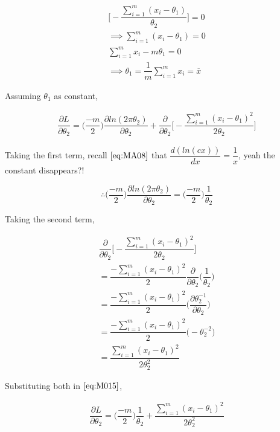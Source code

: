 \documentclass[float=false,crop=false]{standalone}
\begin{document}
\begin{equation}\begin{aligned} 
\Bigg[-\dfrac{  \sum_{i=1}^m(x_i-\theta_1) }{\theta_2}\Bigg] = 0 \\
\implies \sum_{i=1}^m(x_i-\theta_1) = 0 \\
\sum_{i=1}^mx_i-m\theta_1 = 0 \\
\implies \theta_1 = \dfrac{1}{m}\sum_{i=1}^mx_i = \overline{x} \label{eq:M014}
\end{aligned}\end{equation}

    Assuming \(\theta_1\) as constant,

\begin{equation}\begin{aligned}
\dfrac{\partial L}{\partial \theta_2} = \bigg( \dfrac{-m}{2} \bigg) \dfrac{\partial ln(2\pi \theta_2)}{\partial \theta_2} + \dfrac{\partial }{\partial \theta_2}\Bigg[-\dfrac{  \sum_{i=1}^m(x_i-\theta_1)^2 }{2\theta_2}\Bigg] \label{eq:M015}
\end{aligned}\end{equation}

    Taking the first term, recall \(\ref{eq:MA08}\) that
\(\dfrac{d(ln(cx))}{dx} = \dfrac{1}{x}\), yeah the constant disappears?!

\[
\therefore \bigg( \dfrac{-m}{2} \bigg) \dfrac{\partial ln(2\pi \theta_2)}{\partial \theta_2}
= \bigg( \dfrac{-m}{2} \bigg) \dfrac{1}{\theta_2}
\]

    Taking the second term,

\[\begin{aligned}
\dfrac{\partial }{\partial \theta_2}\Bigg[-\dfrac{  \sum_{i=1}^m(x_i-\theta_1)^2 }{2\theta_2}\Bigg] \\
= \dfrac{ - \sum_{i=1}^m(x_i-\theta_1)^2}{2}\dfrac{\partial}{\partial \theta_2}\bigg(\dfrac{1}{\theta_2}\bigg) \\
= \dfrac{ - \sum_{i=1}^m(x_i-\theta_1)^2}{2}\bigg(\dfrac{\partial \theta_2^{-1}}{\partial \theta_2}\bigg) \\
= \dfrac{ - \sum_{i=1}^m(x_i-\theta_1)^2}{2}\bigg(-\theta_2^{-2}\bigg) \\
= \dfrac{ \sum_{i=1}^m(x_i-\theta_1)^2}{2\theta_2^2}
\end{aligned}\]

    Substituting both in \(\ref{eq:M015}\),

\begin{equation}\begin{aligned}
\dfrac{\partial L}{\partial \theta_2} = \bigg( \dfrac{-m}{2} \bigg) \dfrac{1}{\theta_2} + \dfrac{ \sum_{i=1}^m(x_i-\theta_1)^2}{2\theta_2^2} 
\end{aligned}\end{equation}
\end{document}
